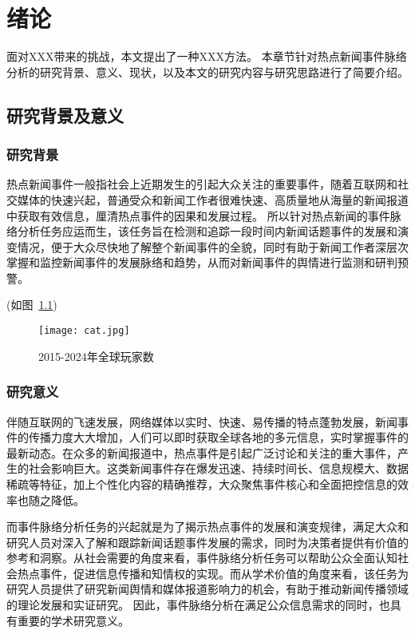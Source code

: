 
\chapter{绪论}

面对XXX带来的挑战，本文提出了一种XXX方法。
本章节针对热点新闻事件脉络分析的研究背景、意义、现状，以及本文的研究内容与研究思路进行了简要介绍。

\section{研究背景及意义}

\subsection{研究背景}

热点新闻事件一般指社会上近期发生的引起大众关注的重要事件，随着互联网和社交媒体的快速兴起，普通受众和新闻工作者很难快速、高质量地从海量的新闻报道中获取有效信息，厘清热点事件的因果和发展过程。
所以针对热点新闻的事件脉络分析任务应运而生，该任务旨在检测和追踪一段时间内新闻话题事件的发展和演变情况，便于大众尽快地了解整个新闻事件的全貌，同时有助于新闻工作者深层次掌握和监控新闻事件的发展脉络和趋势，从而对新闻事件的舆情进行监测和研判预警。

(如图~\ref{fig:newzoo-player-forecast})
\begin{figure}[htb]
  \centering
  \texttt{[image: cat.jpg]}
  \caption{2015-2024年全球玩家数\cite{newzoo2021report}}
  \label{fig:newzoo-player-forecast}
\end{figure}

\subsection{研究意义}


伴随互联网的飞速发展，网络媒体以实时、快速、易传播的特点蓬勃发展，新闻事件的传播力度大大增加，人们可以即时获取全球各地的多元信息，实时掌握事件的最新动态。在众多的新闻报道中，热点事件是引起广泛讨论和关注的重大事件，产生的社会影响巨大。这类新闻事件存在爆发迅速、持续时间长、信息规模大、数据稀疏等特征，加上个性化内容的精确推荐，大众聚焦事件核心和全面把控信息的效率也随之降低。

而事件脉络分析任务的兴起就是为了揭示热点事件的发展和演变规律，满足大众和研究人员对深入了解和跟踪新闻话题事件发展的需求，同时为决策者提供有价值的参考和洞察。从社会需要的角度来看，事件脉络分析任务可以帮助公众全面认知社会热点事件，促进信息传播和知情权的实现。而从学术价值的角度来看，该任务为研究人员提供了研究新闻舆情和媒体报道影响力的机会，有助于推动新闻传播领域的理论发展和实证研究。
因此，事件脉络分析在满足公众信息需求的同时，也具有重要的学术研究意义。

